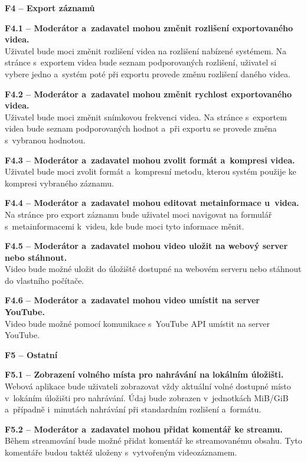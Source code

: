 \documentclass[thesis=M,czech]{FITthesis}[2012/06/26]
\begin{document}
\begin{description}
  \item \textbf{F4 -- Export záznamů}
  \begin{description}
    \item \textbf{F4.1 -- Moderátor a~zadavatel mohou změnit rozlišení exportovaného videa.\\}
	Uživatel bude moci změnit rozlišení videa na rozlišení nabízené systémem. Na stránce s~exportem videa bude seznam podporovaných rozlišení, uživatel si vybere jedno a~systém poté při exportu provede změnu rozlišení daného videa.
    \item \textbf{F4.2 -- Moderátor a~zadavatel mohou změnit rychlost exportovaného videa.\\}
	Uživatel bude moci změnit snímkovou frekvenci videa. Na stránce s~exportem videa bude seznam podporovaných hodnot a~při exportu se provede změna s~vybranou hodnotou.
    \item \textbf{F4.3 -- Moderátor a~zadavatel mohou zvolit formát a~kompresi videa.\\}
	Uživatel bude moci zvolit formát a~kompresní metodu, kterou systém použije ke kompresi vybraného záznamu.
    \item \textbf{F4.4 -- Moderátor a~zadavatel mohou editovat metainformace u~videa.\\}
	Na stránce pro export záznamu bude uživatel moci navigovat na formulář s~metainformacemi k~videu, kde bude moci tyto informace měnit.
    \item \textbf{F4.5 -- Moderátor a~zadavatel mohou video uložit na webový server nebo stáhnout.\\}
	Video bude možné uložit do úložiště dostupné na webovém serveru nebo stáhnout do vlastního počítače.
    \item \textbf{F4.6 -- Moderátor a~zadavatel mohou video umístit na server YouTube.\\}
	Video bude možné pomocí komunikace s~YouTube API umístit na server YouTube.
  \end{description}

  \item \textbf{F5 -- Ostatní}
  \begin{description}
    \item \textbf{F5.1 -- Zobrazení volného místa pro nahrávání na lokálním úložišti.\\}
    Webová aplikace bude uživateli zobrazovat vždy aktuální volné dostupné místo v~lokáním úložišti pro nahrávání. Údaj bude zobrazen v~jednotkách MiB/GiB a~případně i~minutách nahrávání při standardním rozlišení a~formátu.
    \item \textbf{F5.2 -- Moderátor a~zadavatel mohou přidat komentář ke streamu.\\}
	Během streamování bude možné přidat komentář ke streamovanému obsahu. Tyto komentáře budou taktéž uloženy s~vytvořeným videozáznamem.
  \end{description}
\end{description}
\end{document}

